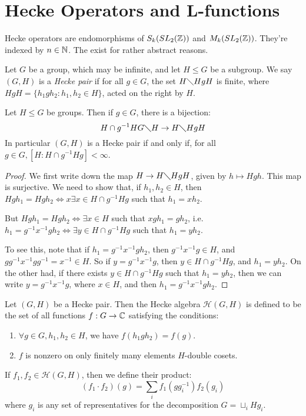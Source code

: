 \documentclass[10pt,a4paper]{article}
\begin{document}
\section{Hecke Operators and L-functions}
Hecke operators are endomorphisms of $S_k(SL_2(\mathbb{Z}))$ and $M_k(SL_2(\mathbb{Z}))$. They're indexed by $n \in \mathbb{N}$. The exist for rather abstract reasons.
\begin{definition}
  Let $G$ be a group, which may be infinite, and let $H \leq G$ be a subgroup. We say $(G,H)$ is a \emph{Hecke pair} if for all $g \in G$, the set $H\diagdown HgH$ is finite, where $HgH = \{h_1gh_2 : h_1, h_2 \in H\}$, acted on the right by $H$.
\end{definition}
\begin{lemma}
  Let $H \leq G$ be groups. Then if $g \in G$, there is a bijection:
  \[H \cap g^{-1}HG \diagdown H \to H\diagdown HgH\]
  In particular $(G,H)$ is a Hecke pair if and only if, for all $g \in G, [H:H\cap g^{-1}Hg] < \infty$.
\end{lemma}
\begin{proof}
  We first write down the map $H \to H \diagdown HgH$, given by $h \mapsto Hgh$. This map is surjective. We need to show that, if $h_1, h_2 \in H$, then $Hgh_1 = Hgh_2 \iff x \exists x \in H\cap g^{-1}Hg$ such that $h_1=xh_2$.

  But $Hgh_1 = Hgh_2 \iff \exists x \in H$ such that $xgh_1 = gh_2$, i.e. $h_1 = g^{-1}x^{-1}gh_2 \iff \exists y \in H\cap g^{-1}Hg$ such that $h_1 = yh_2$.

  To see this, note that if $h_1 = g^{-1}x^{-1}gh_2$, then $g^{-1}x^{-1}g \in H$, and $gg^{-1}x^{-1}gg^{-1} = x^{-1} \in H$. So if $y = g^{-1}x^{-1}g$, then $y \in H\cap g^{-1}Hg$, and $h_1 = yh_2$. On the other had, if there exists $y \in H\cap g^{-1}Hg$ such that $h_1 = yh_2$, then we can write $y = g^{-1}x^{-1}g$, where $x \in H$, and then $h_1 = g^{-1}x^{-1}gh_2$.
\end{proof}
\begin{definition}
  Let $(G,H)$ be a Hecke pair. Then the Hecke algebra $\mathcal{H}(G,H)$ is defined to be the set of all functions $f:G \to \mathbb{C}$ satisfying the conditions:
  \begin{enumerate}
    \item $\forall g\in G, h_1,h_2 \in H$, we have $f(h_1gh_2) = f(g)$.
    \item $f$ is nonzero on only finitely many elements $H$-double cosets.
  \end{enumerate}
  If $f_1, f_2 \in \mathcal{H}(G,H)$, then we define their product:
  \[(f_1 \cdot f_2)(g) = \sum_{i} f_1(gg_i^{-1})f_2(g_i)\]
  where $g_i$ is any set of representatives for the decomposition $G = \sqcup_i Hg_i$.
\end{definition}
\end{document}
